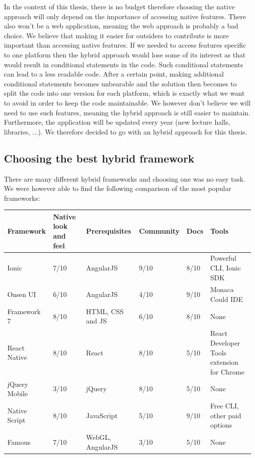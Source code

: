\documentclass{eplmastersthesis}
\begin{document}
In the context of this thesis, there is no budget therefore choosing the native approach will only depend on the importance of accessing native features. There also won't be a web application, meaning the web approach is probably a bad choice. We believe that making it easier for outsiders to contribute is more important than accessing native features. If we needed to access features specific to one platform then the hybrid approach would lose some of its interest as that would result in conditional statements in the code. Such conditional statements can lead to a less readable code. After a certain point, making additional conditional statements becomes unbearable and the solution then becomes to split the code into one version for each platform, which is exactly what we want to avoid in order to keep the code maintainable. We however don't believe we will need to use such features, meaning the hybrid approach is still easier to maintain. Furthermore, the application will be updated every year (new lecture halls, libraries, ...). We therefore decided to go with an hybrid approach for this thesis.

\newpage
\subsection{Choosing the best hybrid framework}
There are many different hybrid frameworks and choosing one was no easy task. We were however able to find the following comparison of the most popular frameworks:

\begin{center}
    \begin{tabular}{ | l | p{2cm} | l | l | l | p{3cm} |}
    \hline
    Framework & Native look and feel & Prerequisites  & Community & Docs & Tools\\ \hline
    Ionic & 7/10 & AngularJS & 9/10 & 8/10 & Powerful CLI, Ionic SDK\\ \hline
    Onsen UI & 6/10 & AngularJS & 4/10 & 9/10 & Monaca Could IDE \\ \hline
    Framework 7 & 8/10 & HTML, CSS and JS & 6/10 & 8/10 & None \\ \hline
    React Native & 8/10 & React & 8/10 & 5/10 & React Developer Tools extension for Chrome \\ \hline
    jQuery Mobile & 3/10 & jQuery & 8/10 & 5/10 & None \\ \hline
   Native Script & 8/10 & JavaScript & 5/10 & 9/10 & Free CLI, other paid options \\ \hline
   Famous & 7/10 & WebGL, AngularJS & 3/10 & 5/10 & None \\ \hline
    \end{tabular}
\end{center}
\end{document}
